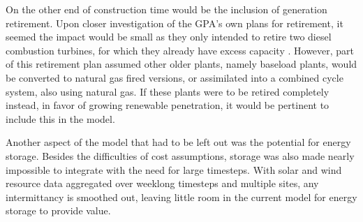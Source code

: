 \documentclass[12pt,letterpaper,fleqn]{article}
\begin{document}
On the other end of construction time would be the inclusion of generation
retirement. Upon closer investigation of the GPA's own plans for retirement, 
it seemed the impact would be small as they only intended to retire two 
diesel combustion turbines, for which they already have excess capacity 
\cite{cruz13}. However, part of this retirement plan assumed other older
 plants, namely baseload plants, would be converted to natural gas fired
versions, or assimilated into a combined cycle system, also using natural gas.
If these plants were to be retired completely instead, in favor of growing 
renewable penetration, it would be pertinent to include this in the model.

Another aspect of the model that had to be left out was the potential
for energy storage. Besides the difficulties of cost assumptions,
storage was also made nearly impossible to integrate with the need for
large timesteps. With solar and wind resource data aggregated over
weeklong timesteps and multiple sites, any intermittancy is smoothed
out, leaving little room in the current model for energy storage to
provide value.
\end{document}
